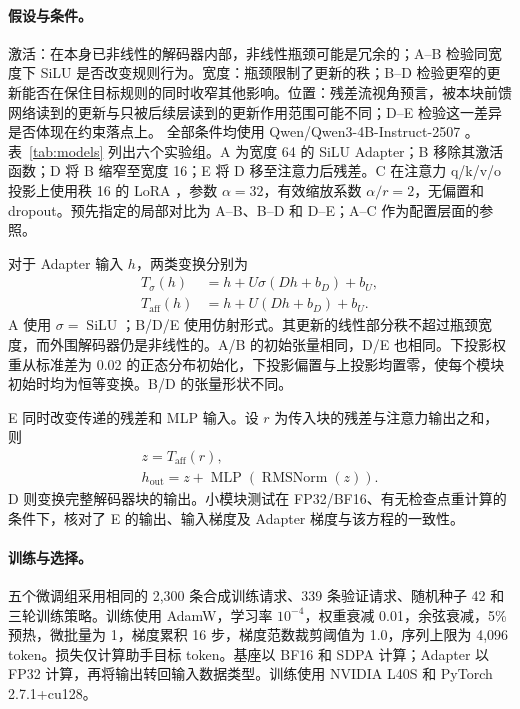 \paragraph{假设与条件。}
激活：在本身已非线性的解码器内部，非线性瓶颈可能是冗余的；A--B 检验同宽度下 SiLU 是否改变规则行为。宽度：瓶颈限制了更新的秩；B--D 检验更窄的更新能否在保住目标规则的同时收窄其他影响。位置：残差流视角预言，被本块前馈网络读到的更新与只被后续层读到的更新作用范围可能不同；D--E 检验这一差异是否体现在约束落点上。
全部条件均使用 Qwen/Qwen3-4B-Instruct-2507 \citep{qwenmodel}。表~\ref{tab:models} 列出六个实验组。A 为宽度 64 的 SiLU Adapter；B 移除其激活函数；D 将 B 缩窄至宽度 16；E 将 D 移至注意力后残差。C 在注意力 q/k/v/o 投影上使用秩 16 的 LoRA \citep{hu2022}，参数 $\alpha=32$，有效缩放系数 $\alpha/r=2$，无偏置和 dropout。预先指定的局部对比为 A--B、B--D 和 D--E；A--C 作为配置层面的参照。

\ModelTable

对于 Adapter 输入 $h$，两类变换分别为
\begin{align}
T_{\sigma}(h)&=h+U\sigma(Dh+b_D)+b_U,\\
T_{\mathrm{aff}}(h)&=h+U(Dh+b_D)+b_U.
\end{align}
A 使用 $\sigma=\operatorname{SiLU}$；B/D/E 使用仿射形式。其更新的线性部分秩不超过瓶颈宽度，而外围解码器仍是非线性的。A/B 的初始张量相同，D/E 也相同。下投影权重从标准差为 0.02 的正态分布初始化，下投影偏置与上投影均置零，使每个模块初始时均为恒等变换。B/D 的张量形状不同。

E 同时改变传递的残差和 MLP 输入。设 $r$ 为传入块的残差与注意力输出之和，则
\begin{equation}
\begin{gathered}
z=T_{\mathrm{aff}}(r),\\
h_{\mathrm{out}}=z+\operatorname{MLP}(\operatorname{RMSNorm}(z)).
\end{gathered}
\end{equation}
D 则变换完整解码器块的输出。小模块测试在 FP32/BF16、有无检查点重计算的条件下，核对了 E 的输出、输入梯度及 Adapter 梯度与该方程的一致性。

\paragraph{训练与选择。}
五个微调组采用相同的 2,300 条合成训练请求、339 条验证请求、随机种子 42 和三轮训练策略。训练使用 AdamW，学习率 $10^{-4}$，权重衰减 0.01，余弦衰减，5\% 预热，微批量为 1，梯度累积 16 步，梯度范数裁剪阈值为 1.0，序列上限为 4,096 token。损失仅计算助手目标 token。基座以 BF16 和 SDPA 计算；Adapter 以 FP32 计算，再将输出转回输入数据类型。训练使用 NVIDIA L40S 和 PyTorch 2.7.1+cu128。

